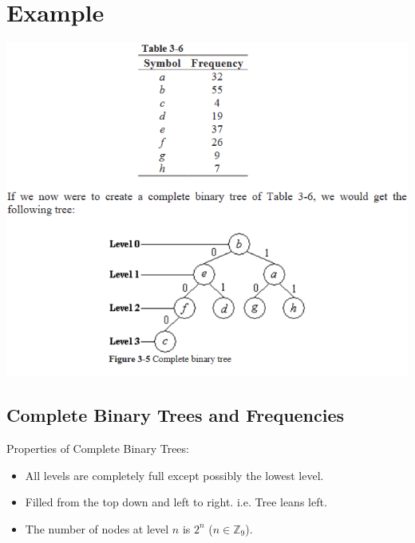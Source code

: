 \documentclass{beamer}
\begin{document}
\section{Example}
\begin{frame}
\begin{center}
\includegraphics[scale=0.55]{example}
\end{center}
\end{frame}

\subsection{Complete Binary Trees and Frequencies}
\begin{frame}
Properties of Complete Binary Trees:
\begin{itemize}
\item All levels are completely full except possibly the lowest level.
\item Filled from the top down and left to right. i.e. Tree leans left.
\item The number of nodes at level $n$ is $2^n$ ($n \in \mathbb{Z}_9$).
\end{itemize}
\end{frame}
\end{document}
